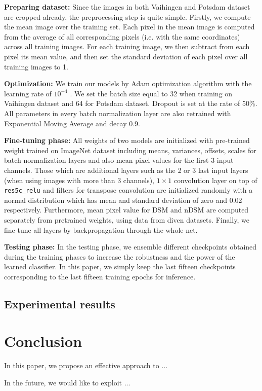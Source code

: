 \documentclass[conference]{IEEEtran}
\begin{document}
\textbf{Preparing dataset:} Since the images in both Vaihingen and Potsdam
dataset are cropped already, the preprocessing step is quite simple. Firstly,
we compute the mean image over the training set. Each pixel in the mean image
is computed from the average of all corresponding pixels (i.e. with the same
coordinates) across all training images. For each training image, we then
subtract from each pixel its mean value, and then set the standard deviation of
each pixel over all training images to 1.

\textbf{Optimization:} We train our models by Adam optimization algorithm with
the learning rate of $10^{-4}$ \cite{kingma2014adam}. We set the batch size
equal to 32 when training on Vaihingen dataset and 64 for Potsdam dataset.
Dropout is set at the rate of 50\%. All parameters in every batch normalization
layer are also retrained with Exponential Moving Average and decay 0.9.

\textbf{Fine-tuning phase:} All weights of two models are initialized with
pre-trained weight trained on ImageNet dataset including means, variances,
offsets, scales for batch normalization layers and also mean pixel values for
the first 3 input channels. Those which are additional layers such as the 2 or
3 last input layers (when using images with more than 3 channels), $1 \times 1$
convolution layer on top of \texttt{res5c\_relu} and filters for transpose
convolution are initialized randomly with a normal distribution which has mean
and standard deviation of zero and 0.02 respectively. Furthermore, mean pixel
value for DSM and nDSM are computed separately from pretrained weights, using
data from diven datasets. Finally, we fine-tune all layers by backpropagation
through the whole net.

\textbf{Testing phase:} In the testing phase, we ensemble different checkpoints
obtained during the training phases to increase the robustness and the power of
the learned classifier. In this paper, we simply keep the last fifteen
checkpoints corresponding to the last fifteen training epochs for inference.

\subsection{Experimental results}

 
\section{Conclusion}
In this paper, we propose an effective approach to ...

In the future, we would like to exploit ...

\balance


\end{document}
